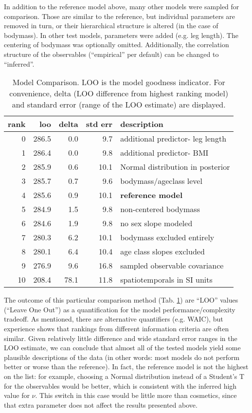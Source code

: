 In addition to the reference model above, many other models were sampled for comparison.
Those are similar to the reference, but individual parameters are removed in turn, or their hierarchical structure is altered (in the case of bodymass).
In other test models, parameters were added (e.g. leg length).
The centering of bodymass was optionally omitted.
Additionally, the correlation structure of the observables (``empirical'' per default) can be changed to ``inferred''.

\begin{table}[p]
\caption{\label{tab:stridemodelcomparison}Model Comparison. LOO is the model goodness indicator. For convenience, delta (LOO difference from highest ranking model) and standard error (range of the LOO estimate) are displayed.}
\centering
\begin{tabular}{rrrrl}
\textbf{rank} & \textbf{loo} & \textbf{delta} & \textbf{std err} & \textbf{description}\\[0pt]
\hline
0 & 286.5 & 0.0 & 9.7 & additional predictor- leg length\\[0pt]
1 & 286.4 & 0.0 & 9.8 & additional predictor- BMI\\[0pt]
2 & 285.9 & 0.6 & 10.1 & Normal distribution in posterior\\[0pt]
3 & 285.7 & 0.7 & 9.6 & bodymass/ageclass level\\[0pt]
4 & 285.6 & 0.9 & 10.1 & \textbf{reference model}\\[0pt]
5 & 284.9 & 1.5 & 9.8 & non-centered bodymass\\[0pt]
6 & 284.6 & 1.9 & 9.8 & no sex slope modeled\\[0pt]
7 & 280.3 & 6.2 & 10.1 & bodymass excluded entirely\\[0pt]
8 & 280.1 & 6.4 & 10.4 & age class slopes excluded\\[0pt]
9 & 276.9 & 9.6 & 16.8 & sampled observable covariance\\[0pt]
10 & 208.4 & 78.1 & 11.8 & spatiotemporals in SI units\\[0pt]
\end{tabular}
\end{table}


The outcome of this particular comparison method (Tab. \ref{tab:stridemodelcomparison}) are ``LOO'' values (``Leave One Out'') as a quantification for the model performance/complexity tradeoff.
As mentioned, there are alternative quantifiers (e.g. WAIC), but experience shows that rankings from different information criteria are often similar.
Given relatively little difference and wide standard error ranges in the LOO estimate, we can conclude that almost all of the tested models yield some plausible descriptions of the data (in other words: most models do not perform  better or worse than the reference).
In fact, the reference model is not the highest on the list: for example, choosing a Normal distribution instead of a Student's T for the observables would be better, which is consistent with the inferred high value for \(\nu\).
This switch in this case would be little more than cosmetics, since that extra parameter does not affect the results presented above.


